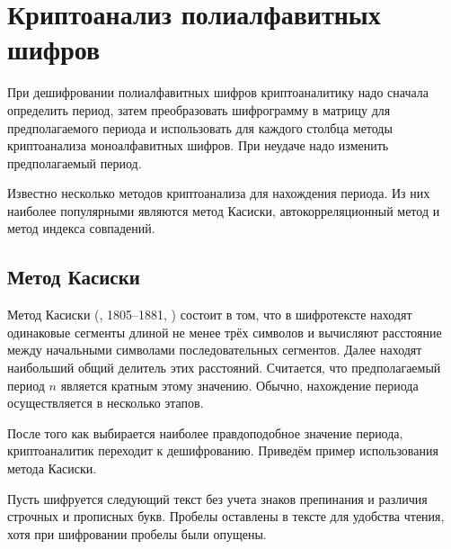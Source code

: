 \section[Криптоанализ полиалфавитных шифров]{Криптоанализ полиалфавитных \protect\\ шифров}

При дешифровании полиалфавитных шифров криптоаналитику надо сначала определить период, затем преобразовать шифрограмму в матрицу для предполагаемого периода и использовать для каждого столбца методы криптоанализа моноалфавитных шифров. При неудаче надо изменить предполагаемый период.

Известно несколько методов криптоанализа для нахождения периода. Из них наиболее популярными являются метод Касиски, автокорреляционный метод и метод индекса совпадений.


\subsection{Метод Касиски}

Метод Касиски (, 1805--1881, \cite{Kasiski:1863}) состоит в том, что в шифротексте находят одинаковые сегменты длиной не менее трёх символов и вычисляют расстояние между начальными символами последовательных сегментов. Далее находят наибольший общий делитель этих расстояний. Считается, что предполагаемый период $n$ является кратным этому значению. Обычно, нахождение периода осуществляется в несколько этапов.

После того как выбирается наиболее правдоподобное значение периода, криптоаналитик переходит к дешифрованию. Приведём пример использования метода Касиски.

\example
Пусть шифруется следующий текст без учета знаков препинания и различия строчных и прописных букв. Пробелы оставлены в тексте для удобства чтения, хотя при шифровании пробелы были опущены.

